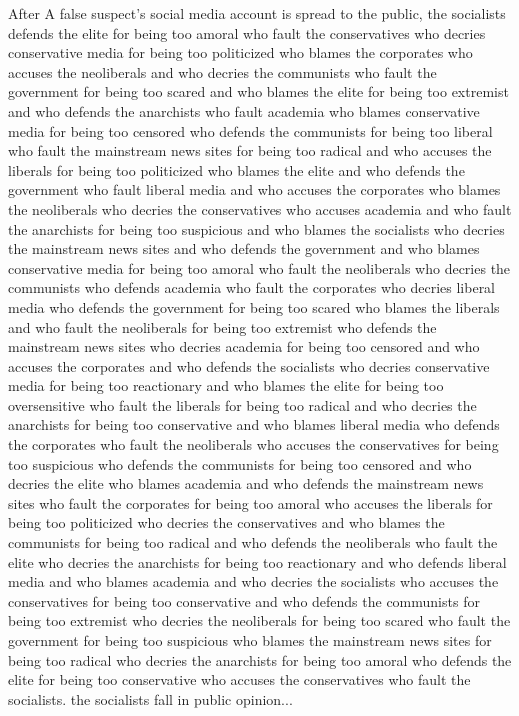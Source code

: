 \documentclass{report}
\begin{document}
After A false suspect's social media account is spread to the public, the socialists defends the elite for being too amoral who fault the conservatives who decries conservative media for being too politicized who blames the corporates who accuses the neoliberals and who decries the communists who fault the government for being too scared and who blames the elite for being too extremist and who defends the anarchists who fault academia who blames conservative media for being too censored who defends the communists for being too liberal who fault the mainstream news sites for being too radical and who accuses the liberals for being too politicized who blames the elite and who defends the government who fault liberal media and who accuses the corporates who blames the neoliberals who decries the conservatives who accuses academia and who fault the anarchists for being too suspicious and who blames the socialists who decries the mainstream news sites and who defends the government and who blames conservative media for being too amoral who fault the neoliberals who decries the communists who defends academia who fault the corporates who decries liberal media who defends the government for being too scared who blames the liberals and who fault the neoliberals for being too extremist who defends the mainstream news sites who decries academia for being too censored and who accuses the corporates and who defends the socialists who decries conservative media for being too reactionary and who blames the elite for being too oversensitive who fault the liberals for being too radical and who decries the anarchists for being too conservative and who blames liberal media who defends the corporates who fault the neoliberals who accuses the conservatives for being too suspicious who defends the communists for being too censored and who decries the elite who blames academia and who defends the mainstream news sites who fault the corporates for being too amoral who accuses the liberals for being too politicized who decries the conservatives and who blames the communists for being too radical and who defends the neoliberals who fault the elite who decries the anarchists for being too reactionary and who defends liberal media and who blames academia and who decries the socialists who accuses the conservatives for being too conservative and who defends the communists for being too extremist who decries the neoliberals for being too scared who fault the government for being too suspicious who blames the mainstream news sites for being too radical who decries the anarchists for being too amoral who defends the elite for being too conservative who accuses the conservatives who fault the socialists. the socialists fall in public opinion...
\end{document}
